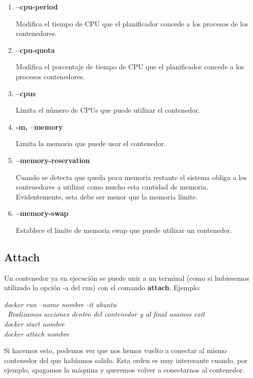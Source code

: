 \documentclass[]{article}
\begin{document}
\begin{enumerate}
\renewcommand{\labelenumi}{$ \bullet $}

\item {\bf --cpu-period}

Modifica el tiempo de CPU que el planificador concede a los procesos de los contenedores.

\item {\bf --cpu-quota}

Modifica el porcentaje de tiempo de CPU que el planificador concede a los procesos contenedores.

\item {\bf --cpus}

Limita el número de CPUs que puede utilizar el contenedor.

\item {\bf -m, --memory}

Limita la memoria que puede usar el contenedor.

\item {\bf --memory-reservation}

Cuando se detecta que queda poca memoria restante el sistema obliga a los contenedores a utilizar como mucho esta cantidad de memoria. Evidentemente, esta debe ser menor que la memoria límite.

\item {\bf --memory-swap}

Establece el limite de memoria swap que puede utilizar un contenedor.

\end{enumerate}

\subsection{Attach}

Un contenedor ya en ejecución se puede unir a un terminal (como si hubiesemos utilizado la opción -a del run) con  el comando {\bf attach}.
Ejemplo:
\begin{center}
	\it
	docker run --name nombre -it ubuntu\\
	~Realizamos acciones dentro del contenedor y al final usamos exit~\\
	docker start nombre\\
	docker attach nombre\\

\end{center}
Si hacemos esto, podemos ver que nos hemos vuelto a conectar al mismo contenedor del que habíamos salido.
Esta orden es muy interesante cuando, por ejemplo, apagamos la máquina y queremos volver a conectarnos al contenedor.
\end{document}
